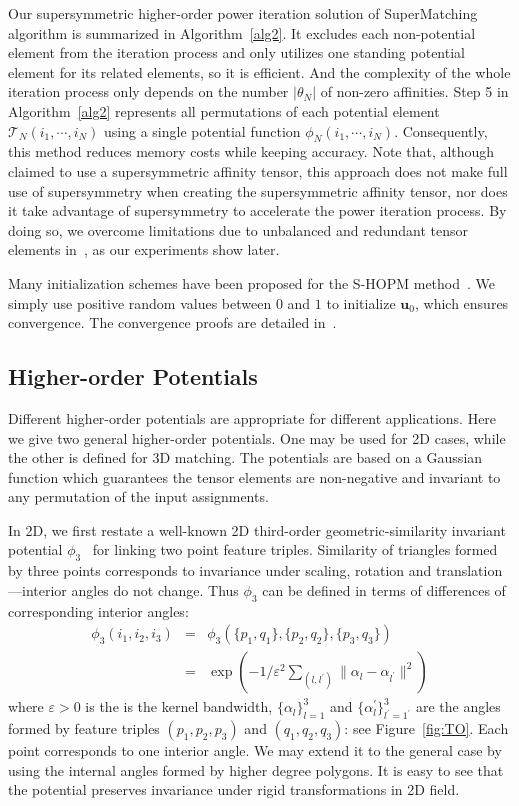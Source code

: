 Our supersymmetric higher-order power iteration solution of SuperMatching algorithm is summarized in Algorithm~\ref{alg2}. 
It excludes each non-potential element from the iteration process and only utilizes one standing potential element for its related elements, so it is efficient.
And the complexity of the whole iteration process only depends on the number $|\theta_N|$ of non-zero affinities. Step 5 in Algorithm~\ref{alg2} represents all permutations of each potential element $\mathcal{T}_N(i_1,\cdots,i_N)$
using a single potential function $\phi_N(i_1,\cdots,i_N)$.
Consequently, this method reduces memory costs while keeping accuracy.
Note that, although~\cite{Duchenne09} claimed to use a supersymmetric affinity tensor,
this approach does not make full use of supersymmetry when creating the supersymmetric affinity tensor,
nor does it take advantage of supersymmetry to accelerate the power iteration process.
By doing so, we overcome limitations due to unbalanced and redundant tensor elements in~\cite{Duchenne09}, as our experiments show later.

Many initialization schemes have been proposed for the S-HOPM method~\cite{Kofidis02}.
We simply use positive random values between $0$ and $1$ to initialize $\boldsymbol{u}_0$, which ensures convergence.
The convergence proofs are detailed in~\cite{Regalia00,Kofidis02}.

\subsection{Higher-order Potentials}
\label{subsec:potentials}

Different higher-order potentials are appropriate for different applications.
Here we give two general higher-order potentials.
One may be used for  2D cases, while the other is defined for 3D matching.
The potentials are based on a Gaussian function
which guarantees the tensor elements are non-negative and invariant to any permutation of the input assignments.

In 2D, we first restate a well-known 2D third-order geometric-similarity invariant potential $\phi_3$~\cite{Duchenne09,Chertok10} for linking two point feature triples.
Similarity of triangles formed by three points corresponds to invariance under scaling, rotation and translation---interior angles do not change.
Thus $\phi_3$ can be defined in terms of differences of corresponding interior angles:
\begin{eqnarray}
\phi_3(i_1,i_2,i_3)&=&\phi_3(\{p_1,q_1\}, \{p_2,q_2\}, \{p_3,q_3\})\nonumber\\
&=&\exp(-1/\varepsilon^2\sum\nolimits_{(l,l^{'})}\lVert \alpha_l- \alpha_{l^{'} } \lVert^2 )
\end{eqnarray}
where $\varepsilon > 0$ is the is the kernel bandwidth,
$\{\alpha_l\}_{l=1}^3$ and $\{\alpha_l^{'}\}_{l^{'}=1^{'}}^{3}$ are the angles formed by feature triples $(p_1,p_2,p_3)$ and $(q_1,q_2,q_3)$:
see Figure~\ref{fig:TO}. Each point corresponds to one interior angle.
We may extend it to the general case by using the internal angles formed by higher degree polygons.
It is easy to see that the potential preserves invariance under rigid transformations in 2D field.


